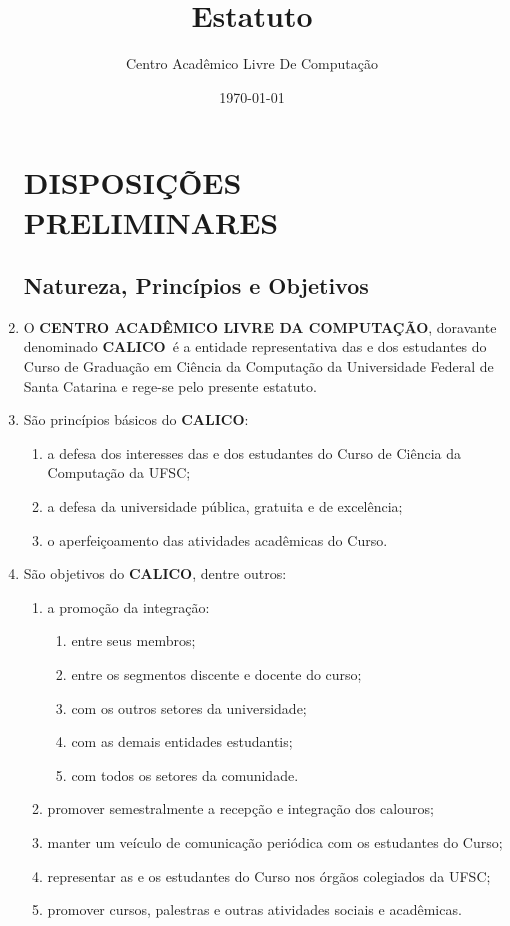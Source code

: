 \documentclass[12pt,a4paper]{article}
\title{Estatuto}
\author{Centro Acadêmico Livre De Computação}
\date{\today}
\newcommand{\calico}{\textbf{CALICO}}
\begin{document}


\begin{enumerate}[label=\textbf{Art. \arabic*º.}]

\section{DISPOSIÇÕES PRELIMINARES}

\subsection{Natureza, Princípios e Objetivos}

    \item O \textbf{CENTRO ACADÊMICO LIVRE DA COMPUTAÇÃO}, doravante denominado \calico\ é a entidade representativa das e dos estudantes do Curso de Graduação em Ciência da Computação da Universidade Federal de Santa Catarina e rege-se pelo presente estatuto.
    
    \item São princípios básicos do \calico:
    \begin{enumerate}[label=\textbf{\Roman* - }]
        \item a defesa dos interesses das e dos estudantes do Curso de Ciência da Computação da UFSC;
        \item a defesa da universidade pública, gratuita e de excelência;
        \item o aperfeiçoamento das atividades acadêmicas do Curso.
    \end{enumerate}

    \item São objetivos do \calico, dentre outros:
    \begin{enumerate}[label=\textbf{\Roman* - }]
        \item a promoção da integração:
            \begin{enumerate}[label=\textbf{\alph*)}]
                \item entre seus membros;
                \item entre os segmentos discente e docente do curso;
                \item com os outros setores da universidade;
                \item com as demais entidades estudantis;
                \item com todos os setores da comunidade.
            \end{enumerate}
        \item promover semestralmente a recepção e integração dos calouros;
        \item manter um veículo de comunicação periódica com os estudantes do Curso;
        \item representar as e os estudantes do Curso nos órgãos colegiados da UFSC;
        \item promover cursos, palestras e outras atividades sociais e acadêmicas.
    \end{enumerate}


\end{enumerate}
\end{document}

